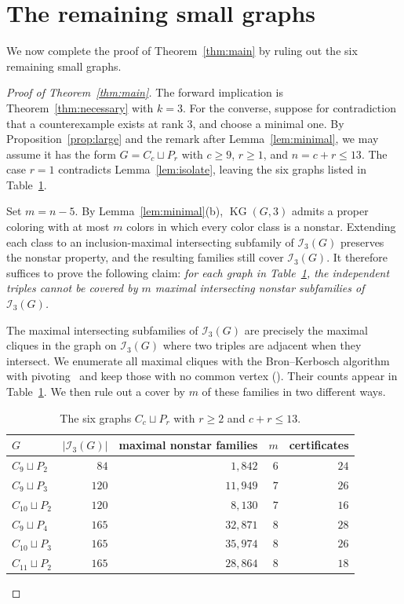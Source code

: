 \documentclass[11pt]{amsart}
\theoremstyle{definition}
\theoremstyle{remark}
\numberwithin{equation}{section}
\newcommand{\KG}{\operatorname{KG}}
\begin{document}
\section{The remaining small graphs}\label{sec:small}

We now complete the proof of Theorem~\ref{thm:main} by ruling out the six
remaining small graphs.

\begin{proof}[Proof of Theorem~\ref{thm:main}]
The forward implication is Theorem~\ref{thm:necessary} with $k=3$. For the
converse, suppose for contradiction that a counterexample exists at rank $3$,
and choose a minimal one. By Proposition~\ref{prop:large} and the remark after
Lemma~\ref{lem:minimal}, we may assume it has the form $G=C_c\sqcup P_r$ with
$c\ge9$, $r\ge1$, and $n=c+r\le13$. The case $r=1$ contradicts
Lemma~\ref{lem:isolate}, leaving the six graphs listed in
Table~\ref{tab:covers}.

Set $m=n-5$. By Lemma~\ref{lem:minimal}(b), $\KG(G,3)$ admits a proper coloring
with at most $m$ colors in which every color class is a nonstar. Extending each
class to an inclusion-maximal intersecting subfamily of $\mathcal I_3(G)$
preserves the nonstar property, and the resulting families still cover
$\mathcal I_3(G)$. It therefore suffices to prove the following claim:
\emph{for each graph in Table~\ref{tab:covers}, the independent triples cannot
be covered by $m$ maximal intersecting nonstar subfamilies of
$\mathcal I_3(G)$.}

The maximal intersecting subfamilies of $\mathcal I_3(G)$ are precisely the
maximal cliques in the graph on $\mathcal I_3(G)$ where two triples are
adjacent when they intersect. We enumerate all maximal cliques with the
Bron--Kerbosch algorithm with pivoting~\cite{BK} and keep those with no common
vertex (). Their counts appear in
Table~\ref{tab:covers}. We then rule out a cover by $m$ of these families in
two different ways.

\begin{table}[ht]
\centering
\small
\begin{tabular}{lrrrr}
\toprule
$G$ & $|\mathcal I_3(G)|$ & maximal nonstar families & $m$ & certificates\\
\midrule
$C_9\sqcup P_2$ & $84$ & $1{,}842$ & $6$ & $24$\\
$C_9\sqcup P_3$ & $120$ & $11{,}949$ & $7$ & $26$\\
$C_{10}\sqcup P_2$ & $120$ & $8{,}130$ & $7$ & $16$\\
$C_9\sqcup P_4$ & $165$ & $32{,}871$ & $8$ & $28$\\
$C_{10}\sqcup P_3$ & $165$ & $35{,}974$ & $8$ & $26$\\
$C_{11}\sqcup P_2$ & $165$ & $28{,}864$ & $8$ & $18$\\
\bottomrule
\end{tabular}
\caption{The six graphs $C_c\sqcup P_r$ with $r\ge2$ and $c+r\le13$.}
\label{tab:covers}
\end{table}


\end{proof}
\end{document}
